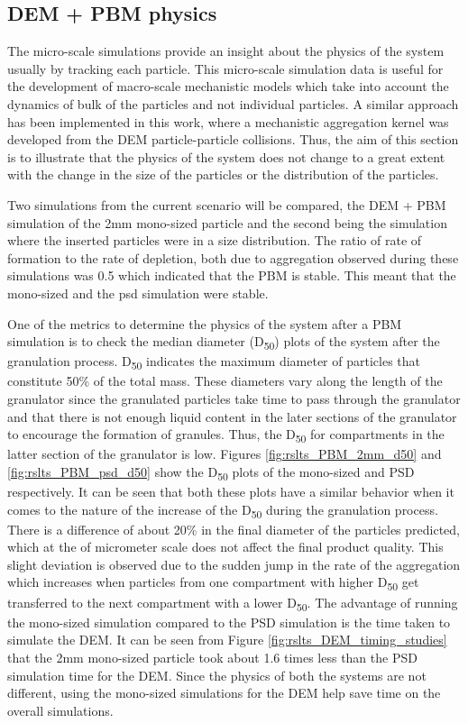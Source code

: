 \documentclass[preprint,11pt,authoryear]{elsarticle}
\begin{document}
\subsection{DEM + PBM physics}
The micro-scale simulations provide an insight about the physics of the system usually by tracking 
each particle. This micro-scale simulation data is useful for the development of macro-scale 
mechanistic models which take into account the dynamics of bulk of the particles and not individual 
particles. A similar approach has been implemented in this work, where a mechanistic aggregation 
kernel was developed from the DEM particle-particle collisions. Thus, the aim of this section is to 
illustrate that the physics of the system does not change to a great extent with the change in the size 
of the particles or the distribution of the particles.

Two simulations from the current scenario will be compared, the DEM + PBM simulation of the 2mm 
mono-sized particle and the second being the simulation where the inserted particles were in a size 
distribution. The ratio of rate of formation to the rate of depletion, both due to aggregation 
observed during these simulations was 0.5 which indicated that the PBM is stable. This meant that the
mono-sized and the psd simulation were stable.

One of the metrics to determine the physics of the system after a PBM simulation is to check the 
median diameter (D\textsubscript{50}) plots of the system after the granulation process. 
D\textsubscript{50} indicates the maximum diameter of particles that constitute 50\% of the total mass. 
These diameters vary along the length of the granulator since the granulated particles take time to 
pass through the granulator and that there is not enough liquid content in the later sections of 
the granulator to encourage the formation of granules. Thus, the D\textsubscript{50} for compartments 
in the latter section of the granulator is low. Figures \ref{fig:rslts_PBM_2mm_d50} and 
\ref{fig:rslts_PBM_psd_d50} show the D\textsubscript{50} plots of the mono-sized and PSD respectively. 
It can be seen that both these plots have a similar behavior when it comes to the nature of the 
increase of the D\textsubscript{50} during the granulation process. There is a difference of about 
20\% in the final diameter of the particles predicted, which at the of micrometer scale does not affect 
the final product quality. This slight deviation is observed due to the sudden jump in the 
rate of the aggregation which increases when particles from one compartment with higher 
D\textsubscript{50} get transferred to the next compartment with a lower D\textsubscript{50}. 
The advantage of running the mono-sized simulation compared to the PSD simulation is the 
time taken to simulate the DEM. It can be seen from Figure \ref{fig:rslts_DEM_timing_studies} that 
the 2mm mono-sized particle took about 1.6 times less than the PSD simulation time for the DEM. 
Since the physics of both the systems are not different, using the mono-sized simulations 
for the DEM help save time on the overall simulations. 
\end{document}
